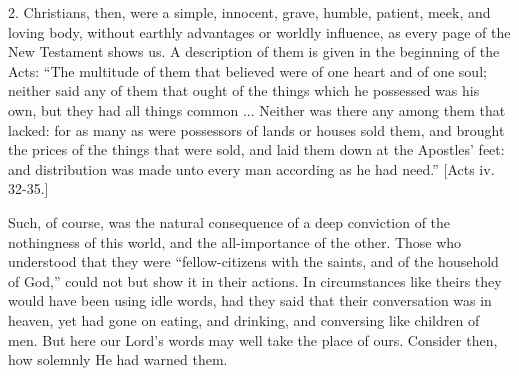 2. Christians, then, were a simple, innocent, grave, humble,
patient, meek, and loving body, without earthly advantages or worldly
influence, as every page of the New Testament shows us. A description
of them is given in the beginning of the Acts: ``The multitude of
them that believed were of one heart and of one soul; neither said any
of them that ought of the things which he possessed was his own, but
they had all things common ... Neither was there any among them that
lacked: for as many as were possessors of lands or houses sold them,
and brought the prices of the things that were sold, and laid them
down at the Apostles' feet: and distribution was made unto every man
according as he had need.'' [Acts iv. 32-35.]

Such, of course, was the natural consequence of a deep conviction
of the nothingness of this world, and the all-importance of the other.
Those who understood that they were ``fellow-citizens with the
saints, and of the household of God,'' could not but show it in
their actions. In circumstances like theirs they would have been using
idle words, had they said that their conversation was in heaven, yet
had gone on eating, and drinking, and conversing like children of men.
But here our Lord's words may well take the place of ours. Consider
then, how solemnly He had warned them.

